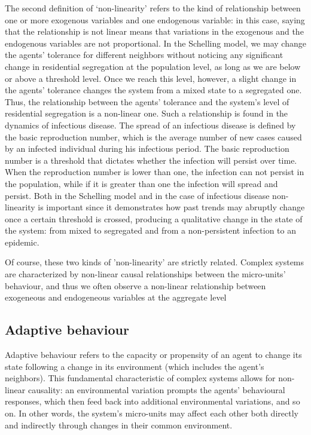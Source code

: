 \documentclass[review]{elsarticle}
\begin{document}
The second definition of `non-linearity' refers to the kind of relationship between one or more exogenous variables and one endogenous variable: in this case, saying that the relationship is not linear means that variations in the exogenous and the endogenous variables are not proportional. In the Schelling model, we may change the agents' tolerance for different neighbors without noticing any significant change in residential segregation at the population level, as long as we are below or above a threshold level. Once we reach this level, however, a slight change in the agents' tolerance changes the system from a mixed state to a segregated one. Thus, the relationship between the agents' tolerance and the system's level of residential segregation is a non-linear one. Such a relationship is found in the dynamics of infectious disease. The spread of an infectious disease is defined by the basic reproduction number, which is the average number of new cases caused by an infected individual during his infectious period. The basic reproduction number is a threshold that dictates whether the infection will persist over time. When the reproduction number is lower than one, the infection can not persist in the population, while if it is greater than one the infection will spread and persist. Both in the Schelling model and in the case of infectious disease non-linearity is important since it demonstrates how past trends may abruptly change once a certain threshold is crossed, producing a qualitative change in the state of the system: from mixed to segregated and from a non-persistent infection to an epidemic. 

Of course, these two kinds of 'non-linearity' are strictly related. Complex systems are characterized by non-linear causal relationships between the micro-units' behaviour, and thus we often observe a non-linear relationship between exogeneous and endogeneous variables at the aggregate level

\subsection{Adaptive behaviour}
Adaptive behaviour refers to the capacity or propensity of an agent to change its state following a change in its environment (which includes the agent's neighbors). This fundamental characteristic of complex systems allows for non-linear causality: an environmental variation prompts the agents' behavioural responses, which then feed back into additional environmental variations, and so on. In other words, the system's micro-units may affect each other both directly and indirectly through changes in their common environment. 
\end{document}
